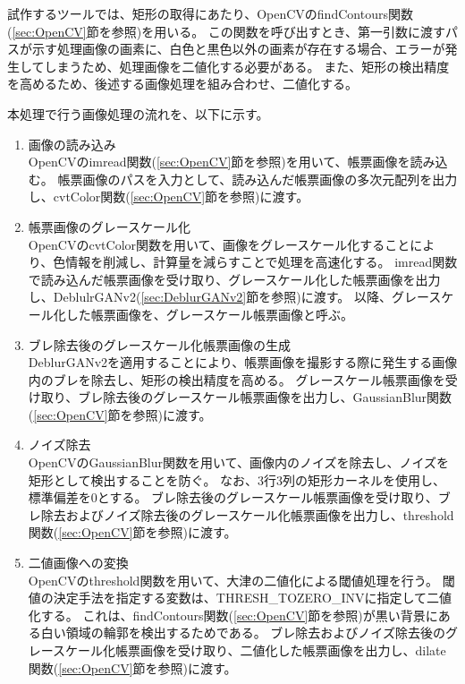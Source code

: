 試作するツールでは、矩形の取得にあたり、OpenCVのfindContours関数(\ref{sec:OpenCV}節を参照)を用いる。
この関数を呼び出すとき、第一引数に渡すパスが示す処理画像の画素に、白色と黒色以外の画素が存在する場合、エラーが発生してしまうため、処理画像を二値化する必要がある。
また、矩形の検出精度を高めるため、後述する画像処理を組み合わせ、二値化する。

本処理で行う画像処理の流れを、以下に示す。

\begin{enumerate}
    \item 画像の読み込み\\
        OpenCVのimread関数(\ref{sec:OpenCV}節を参照)を用いて、帳票画像を読み込む。
        帳票画像のパスを入力として、読み込んだ帳票画像の多次元配列を出力し、cvtColor関数(\ref{sec:OpenCV}節を参照)に渡す。
    \item 帳票画像のグレースケール化\\
        OpenCVのcvtColor関数を用いて、画像をグレースケール化することにより、色情報を削減し、計算量を減らすことで処理を高速化する。
        imread関数で読み込んだ帳票画像を受け取り、グレースケール化した帳票画像を出力し、DeblulrGANv2(\ref{sec:DeblurGANv2}節を参照)に渡す。
        以降、グレースケール化した帳票画像を、グレースケール帳票画像と呼ぶ。
    \item ブレ除去後のグレースケール化帳票画像の生成\\
        DeblurGANv2を適用することにより、帳票画像を撮影する際に発生する画像内のブレを除去し、矩形の検出精度を高める。
        グレースケール帳票画像を受け取り、ブレ除去後のグレースケール帳票画像を出力し、GaussianBlur関数(\ref{sec:OpenCV}節を参照)に渡す。
    \item ノイズ除去\\
        OpenCVのGaussianBlur関数を用いて、画像内のノイズを除去し、ノイズを矩形として検出することを防ぐ。
        なお、3行3列の矩形カーネルを使用し、標準偏差を0とする。
        ブレ除去後のグレースケール帳票画像を受け取り、ブレ除去およびノイズ除去後のグレースケール化帳票画像を出力し、threshold関数(\ref{sec:OpenCV}節を参照)に渡す。
    \item 二値画像への変換\\
        OpenCVのthreshold関数を用いて、大津の二値化による閾値処理を行う。
        閾値の決定手法を指定する変数は、THRESH\_TOZERO\_INVに指定して二値化する。
        これは、findContours関数(\ref{sec:OpenCV}節を参照)が黒い背景にある白い領域の輪郭を検出するためである。
        ブレ除去およびノイズ除去後のグレースケール化帳票画像を受け取り、二値化した帳票画像を出力し、dilate関数(\ref{sec:OpenCV}節を参照)に渡す。

\end{enumerate}
